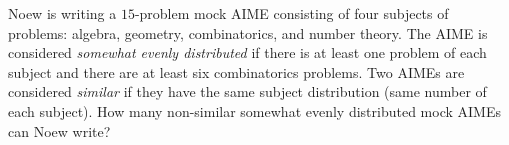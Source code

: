 Noew is writing a $15$-problem mock AIME consisting of four subjects of problems: algebra, geometry, combinatorics, and number theory. The AIME is considered \emph{somewhat evenly distributed} if there is at least one problem of each subject and there are at least six combinatorics problems. Two AIMEs are considered \emph{similar} if they have the same subject distribution (same number of each subject). How many non-similar somewhat evenly distributed mock AIMEs can Noew write?